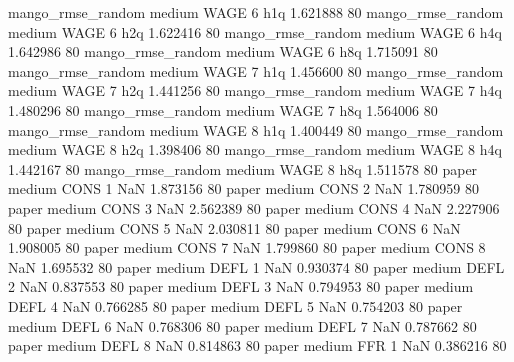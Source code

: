 mango_rmse_random     medium     WAGE                 6                  h1q  1.621888 80
mango_rmse_random     medium     WAGE                 6                  h2q  1.622416 80
mango_rmse_random     medium     WAGE                 6                  h4q  1.642986 80
mango_rmse_random     medium     WAGE                 6                  h8q  1.715091 80
mango_rmse_random     medium     WAGE                 7                  h1q  1.456600 80
mango_rmse_random     medium     WAGE                 7                  h2q  1.441256 80
mango_rmse_random     medium     WAGE                 7                  h4q  1.480296 80
mango_rmse_random     medium     WAGE                 7                  h8q  1.564006 80
mango_rmse_random     medium     WAGE                 8                  h1q  1.400449 80
mango_rmse_random     medium     WAGE                 8                  h2q  1.398406 80
mango_rmse_random     medium     WAGE                 8                  h4q  1.442167 80
mango_rmse_random     medium     WAGE                 8                  h8q  1.511578 80
            paper     medium     CONS                 1                  NaN  1.873156 80
            paper     medium     CONS                 2                  NaN  1.780959 80
            paper     medium     CONS                 3                  NaN  2.562389 80
            paper     medium     CONS                 4                  NaN  2.227906 80
            paper     medium     CONS                 5                  NaN  2.030811 80
            paper     medium     CONS                 6                  NaN  1.908005 80
            paper     medium     CONS                 7                  NaN  1.799860 80
            paper     medium     CONS                 8                  NaN  1.695532 80
            paper     medium     DEFL                 1                  NaN  0.930374 80
            paper     medium     DEFL                 2                  NaN  0.837553 80
            paper     medium     DEFL                 3                  NaN  0.794953 80
            paper     medium     DEFL                 4                  NaN  0.766285 80
            paper     medium     DEFL                 5                  NaN  0.754203 80
            paper     medium     DEFL                 6                  NaN  0.768306 80
            paper     medium     DEFL                 7                  NaN  0.787662 80
            paper     medium     DEFL                 8                  NaN  0.814863 80
            paper     medium      FFR                 1                  NaN  0.386216 80
